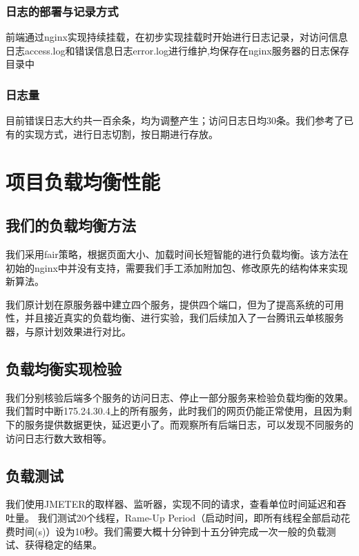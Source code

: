 \documentclass{article}
\begin{document}
\subsubsection{日志的部署与记录方式}
前端通过nginx实现持续挂载，在初步实现挂载时开始进行日志记录，对访问信息日志access.log和错误信息日志error.log进行维护,均保存在nginx服务器的日志保存目录中
\subsubsection{日志量}
目前错误日志大约共一百余条，均为调整产生；访问日志日均30条。我们参考了已有的实现方式，进行日志切割，按日期进行存放。


\section{项目负载均衡性能}

\subsection{我们的负载均衡方法}
我们采用fair策略，根据页面大小、加载时间长短智能的进行负载均衡。该方法在初始的nginx中并没有支持，需要我们手工添加附加包、修改原先的结构体来实现新算法。

我们原计划在原服务器中建立四个服务，提供四个端口，但为了提高系统的可用性，并且接近真实的负载均衡、进行实验，我们后续加入了一台腾讯云单核服务器，与原计划效果进行对比。



\subsection{负载均衡实现检验}
我们分别核验后端多个服务的访问日志、停止一部分服务来检验负载均衡的效果。
我们暂时中断175.24.30.4上的所有服务，此时我们的网页仍能正常使用，且因为剩下的服务提供数据更快，延迟更小了。而观察所有后端日志，可以发现不同服务的访问日志行数大致相等。

\subsection{负载测试}
我们使用JMETER的取样器、监听器，实现不同的请求，查看单位时间延迟和吞吐量。
我们测试20个线程，Rame-Up Period（启动时间，即所有线程全部启动花费时间(s)）设为10秒。我们需要大概十分钟到十五分钟完成一次一般的负载测试、获得稳定的结果。
\end{document}
